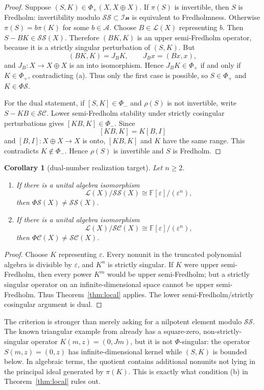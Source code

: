 \documentclass[11pt]{article}
\newtheorem{corollary}[theorem]{Corollary}
\theoremstyle{definition}
\newcommand{\Lop}{\mathcal L}
\newcommand{\SSing}{\mathcal{SS}}
\newcommand{\SCos}{\mathcal{SC}}
\newcommand{\Iness}{\mathcal{In}}
\newcommand{\PhiS}{\Phi\mathcal S}
\newcommand{\PhiC}{\Phi\mathcal C}
\newcommand{\PhiP}{\Phi_+}
\newcommand{\PhiM}{\Phi_-}
\newcommand{\F}{\mathbb F}
\begin{document}
\begin{proof}
Suppose \((S,K)\in\PhiP(X,X\oplus X)\).  If \(\pi(S)\) is invertible, then \(S\) is
Fredholm: invertibility modulo \(\SSing\subset\Iness\) is equivalent to Fredholmness.
Otherwise \(\pi(S)=b\pi(K)\) for some \(b\in\mathcal A\).  Choose
\(B\in\Lop(X)\) representing \(b\).  Then \(S-BK\in\SSing(X)\).  Therefore
\((BK,K)\) is an upper semi-Fredholm operator, because it is a strictly singular
perturbation of \((S,K)\).  But
\[
 (BK,K)=J_BK,\qquad J_Bx=(Bx,x),
\]
and \(J_B\colon X\to X\oplus X\) is an into isomorphism.  Hence \(J_BK\in\PhiP\)
if and only if \(K\in\PhiP\), contradicting (a).  Thus only the first case is possible,
so \(S\in\PhiP\) and \(K\in\PhiS\).

For the dual statement, if \([S,K]\in\PhiM\) and \(\rho(S)\) is not invertible, write
\(S-KB\in\SCos\).  Lower semi-Fredholm stability under strictly cosingular
perturbations gives \([KB,K]\in\PhiM\).  Since
\[
 [KB,K]=K[B,I]
\]
and \([B,I]\colon X\oplus X\to X\) is onto, \([KB,K]\) and \(K\) have the same
range.  This contradicts \(K\notin\PhiM\).  Hence \(\rho(S)\) is invertible and \(S\)
is Fredholm.
\end{proof}

\begin{corollary}[dual-number realization target]\label{cor:dualnumbers}
Let \(n\ge2\).
\begin{enumerate}[label=\rm(\roman*)]
\item If there is a unital algebra isomorphism
\[
 \Lop(X)/\SSing(X)\cong \F[\varepsilon]/(\varepsilon^n),
\]
then \(\PhiS(X)\ne\SSing(X)\).
\item If there is a unital algebra isomorphism
\[
 \Lop(X)/\SCos(X)\cong \F[\varepsilon]/(\varepsilon^n),
\]
then \(\PhiC(X)\ne\SCos(X)\).
\end{enumerate}
\end{corollary}

\begin{proof}
Choose \(K\) representing \(\varepsilon\).  Every nonunit in the truncated polynomial
algebra is divisible by \(\varepsilon\), and \(K^n\) is strictly singular.  If \(K\) were
upper semi-Fredholm, then every power \(K^m\) would be upper semi-Fredholm; but a
strictly singular operator on an infinite-dimensional space cannot be upper semi-Fredholm.
Thus Theorem~\ref{thm:local} applies.  The lower semi-Fredholm/strictly cosingular
argument is dual.
\end{proof}

The criterion is stronger than merely asking for a nilpotent element modulo
\(\SSing\).  The known triangular example from \cite[Example~2.3]{Aiena2012} already
has a square-zero, non-strictly-singular operator
\(K(m,z)=(0,Jm)\), but it is not \(\Phi\)-singular: the operator
\(S(m,z)=(0,z)\) has infinite-dimensional kernel while \((S,K)\) is bounded below.  In
algebraic terms, the quotient contains additional nonunits not lying in the principal ideal
generated by \(\pi(K)\).  This is exactly what condition (b) in
Theorem~\ref{thm:local} rules out.
\end{document}
